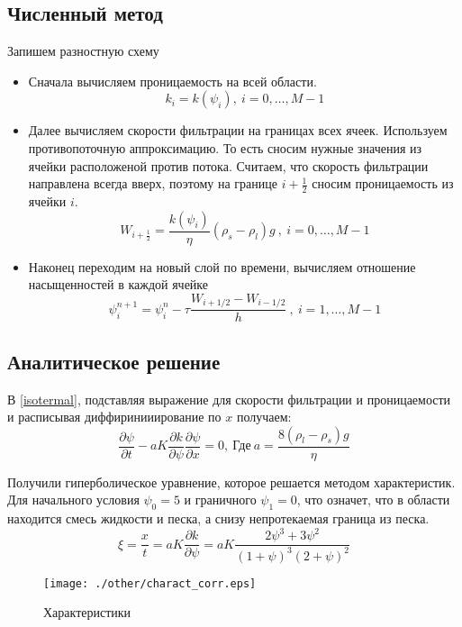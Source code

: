 \documentclass[12pt,a4paper]{article}
\newcommand{\pd}[2]{\frac{\partial #1}{\partial #2}}
\begin{document}
\subsection{Численный метод}
Запишем разностную схему
\begin{itemize}
\item Сначала вычисляем проницаемость на всей области.
\begin{equation}
k_i = k(\psi_i) , \ i = 0,  \dots ,M-1
\label{perm_razn}
\end{equation}

\item Далее вычисляем скорости фильтрации на границах всех ячеек. Используем противопоточную аппроксимацию. То есть сносим нужные значения из ячейки расположеной против потока. Считаем, что скорость фильтрации направлена всегда вверх, поэтому на границе $i + \frac12$ сносим проницаемость из ячейки $i$.
\begin{equation}
W_{i+\frac12} = \frac{k(\psi_i)}{\eta}(\rho_s-\rho_l)g \ , \ i = 0,  \dots ,M-1
\label{Darsi_razn}
\end{equation}

\item Наконец переходим на новый слой по времени, вычисляем отношение насыщенностей в каждой ячейке
\begin{equation}
\psi_i^{n+1} = \psi_i^n - \tau\frac{W_{i+1/2} - W_{i-1/2}}{h} \ , \ i = 1,  \dots ,M-1
\label{filtr_razn}
\end{equation}
\end{itemize}

\subsection{Аналитическое решение}
В \eqref{isotermal}, подставляя выражение для скорости фильтрации и проницаемости и расписывая диффиринииирование по $x$ получаем:
\begin{equation}
\pd{\psi}{t} - a K \pd{k}{\psi} \pd{\psi}{x} = 0,\  \text{Где}\ a = \frac{8(\rho_l-\rho_s)g}{\eta}
\label{characteristics}
\end{equation}

Получили гиперболическое уравнение, которое решается методом характеристик. Для начального условия $\psi_0 = 5$ и граничного $\psi_1 = 0$, что означет, что в области находится смесь жидкости и песка, а снизу непротекаемая граница из песка.
$$
\xi = \frac{x}{t} = a K \pd{k}{\psi} =   a K \frac{2\psi^3 + 3\psi^2}{(1 + \psi)^3(2+\psi)^2}
$$
\begin{figure}[h!]
\begin{center}
\texttt{[image: ./other/charact\_corr.eps]}
\caption{Характеристики}
\end{center}
\end{figure}
\end{document}
